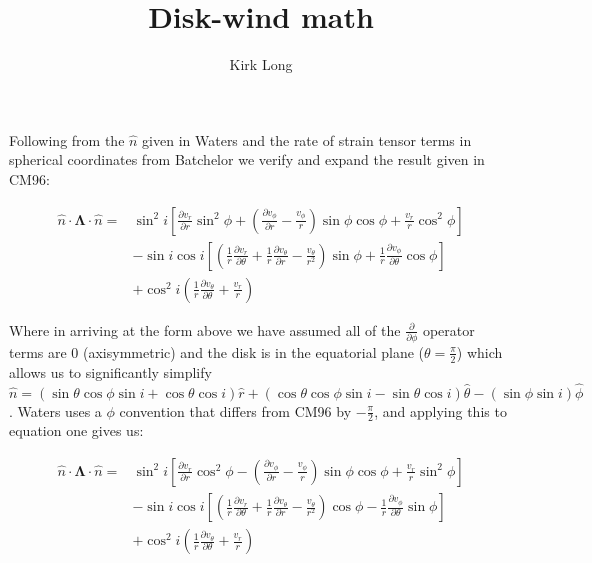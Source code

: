 \documentclass{article}
\title{Disk-wind math}
\author{Kirk Long}
\begin{document}
\maketitle

Following from the $\hat{n}$ given in Waters and the rate of strain tensor terms in spherical coordinates from Batchelor we verify and expand the result given in CM96:

\begin{equation} \label{eq1}
\begin{split}
\hat{n}\cdot\boldsymbol{\Lambda}\cdot\hat{n} = & \sin^2i\left[\frac{\partial v_r}{\partial r}\sin^2\phi + \left(\frac{\partial v_\phi}{\partial r} - \frac{v_\phi}{r}\right)\sin\phi\cos\phi + \frac{v_r}{r}\cos^2\phi \right] \\
& -\sin i\cos i\left[\left(\frac{1}{r}\frac{\partial v_r}{\partial \theta} + \frac{1}{r} \frac{\partial v_\theta}{\partial r} - \frac{v_\theta}{r^2}\right)\sin\phi  + \frac{1}{r}\frac{\partial v_\phi}{\partial \theta}\cos\phi\right] \\
& +\cos^2i\left(\frac{1}{r}\frac{\partial v_\theta}{\partial \theta} + \frac{v_r}{r}\right)
\end{split}
\end{equation}

Where in arriving at the form above we have assumed all of the $\frac{\partial}{\partial \phi}$ operator terms are 0 (axisymmetric) and the disk is in the equatorial plane ($\theta = \frac{\pi}{2}$) which allows us to significantly simplify $\hat{n} = \left(\sin\theta\cos\phi\sin i + \cos\theta\cos i\right)\hat{r} + \left(\cos\theta\cos\phi\sin i - \sin\theta\cos i\right)\hat{\theta} - \left(\sin\phi\sin i\right)\hat{\phi}$. Waters uses a $\phi$ convention that differs from CM96 by $-\frac{\pi}{2}$, and applying this to equation one gives us:

\begin{equation} \label{eq2}
\begin{split}
\hat{n}\cdot\boldsymbol{\Lambda}\cdot\hat{n} = & \sin^2i\left[\frac{\partial v_r}{\partial r}\cos^2\phi - \left(\frac{\partial v_\phi}{\partial r} - \frac{v_\phi}{r}\right)\sin\phi\cos\phi + \frac{v_r}{r}\sin^2\phi \right] \\
& -\sin i\cos i\left[\left(\frac{1}{r}\frac{\partial v_r}{\partial \theta} + \frac{1}{r} \frac{\partial v_\theta}{\partial r} - \frac{v_\theta}{r^2}\right) \cos\phi - \frac{1}{r}\frac{\partial v_\phi}{\partial \theta}\sin\phi\right] \\
& +\cos^2i\left(\frac{1}{r}\frac{\partial v_\theta}{\partial \theta} + \frac{v_r}{r}\right)
\end{split}
\end{equation}
\end{document}
